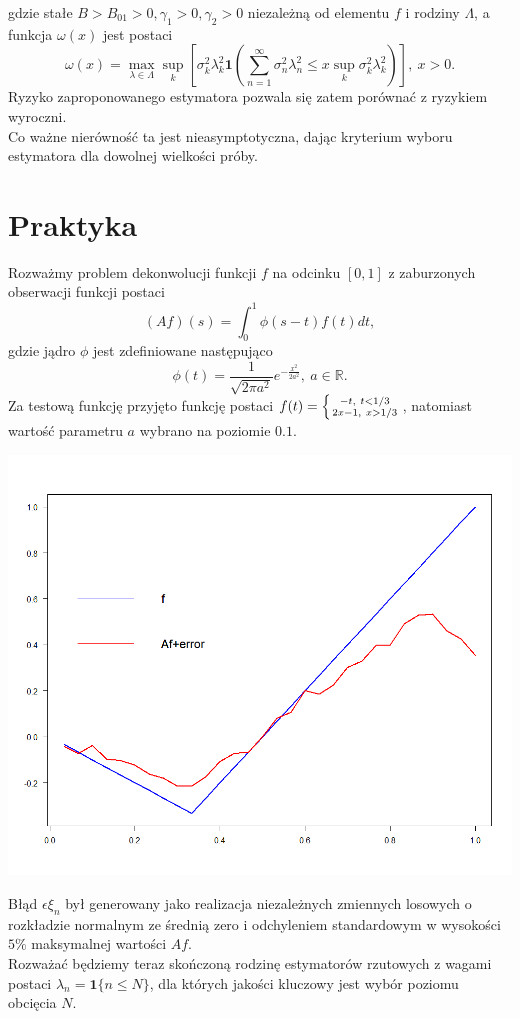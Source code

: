 \documentclass[a0,portrait]{a0poster}
\begin{document}
\begin{multicols}{2}
\begin{displaymath}
\end{displaymath}
gdzie stałe $B>B_01>0,\gamma_1>0,\gamma_2>0$ niezależną od elementu $f$ i rodziny $\Lambda$, a funkcja $\omega(x)$ jest postaci
\begin{displaymath}
\omega(x)=\max_{\lambda\in \Lambda}\sup_k\left[\sigma_k^2\lambda_k^2\pmb{1}\left(\sum_{n=1}^{\infty}\sigma_n^2\lambda_n^2\leq x \sup_k\sigma_k^2\lambda_k^2\right)\right],\ x>0.
\end{displaymath}
Ryzyko zaproponowanego estymatora pozwala się zatem porównać z ryzykiem wyroczni.\\
Co ważne nierówność ta jest nieasymptotyczna, dając kryterium wyboru estymatora dla dowolnej wielkości próby.
\section*{Praktyka}
Rozważmy problem dekonwolucji funkcji $f$ na odcinku $[0,1]$ z zaburzonych obserwacji funkcji postaci
\begin{displaymath}
(Af)(s)=\int_0^1\phi (s-t)f(t)dt,
\end{displaymath}
gdzie jądro $\phi$ jest zdefiniowane następująco
\begin{displaymath}
\phi(t)=\frac{1}{\sqrt{2\pi a^2}}e^{-\frac{x^2}{2a^2}},\ a\in \mathbb{R}.
\end{displaymath} 
Za testową funkcję przyjęto funkcję postaci $f(t)=\left\{{-t,\ t<1/3}\atop {2x-1,\ x>1/3}\right.$, natomiast wartość parametru $a$ wybrano na poziomie $0.1$. 
\begin{center}
\includegraphics[width=0.4\linewidth]{f}
\end{center}
Błąd $\epsilon\xi_n$ był generowany jako realizacja niezależnych zmiennych losowych o rozkładzie normalnym ze średnią zero i odchyleniem standardowym w wysokości $5\%$ maksymalnej wartości $Af$.\\
Rozważać będziemy teraz skończoną rodzinę estymatorów rzutowych z wagami postaci $\lambda_n=\pmb{1}\{n\leq N\}$, dla których jakości kluczowy jest wybór poziomu obcięcia $N$.\\

\end{multicols}
\end{document}
